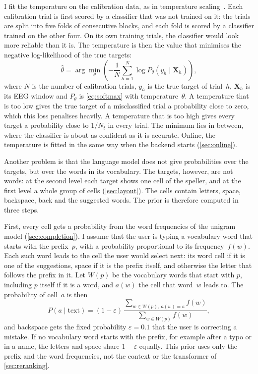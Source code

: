 I fit the temperature on the calibration data, as in temperature
scaling~\citep{guo2017calibration}. Each calibration trial is first scored by a
classifier that was not trained on it: the trials are split into five folds of
consecutive blocks, and each fold is scored by a classifier trained on the other four.
On its own training trials, the classifier would look more reliable than it is. The
temperature is then the value that minimises the negative log-likelihood of the true
targets:
\begin{equation}
    \hat{\theta} = \arg\min_{\theta} \left( -\frac{1}{N} \sum_{h=1}^{N} \log P_\theta(y_h \mid \mathbf{X}_h) \right),
    \label{eq:temperature}
\end{equation}
where $N$ is the number of calibration trials, $y_h$ is the true target of trial~$h$,
$\mathbf{X}_h$ is its \ac{EEG} window and $P_\theta$ is \cref{eq:softmax} with
temperature~$\theta$. A temperature that is too low gives the true target of a
misclassified trial a probability close to zero, which this loss penalises heavily. A
temperature that is too high gives every target a probability close to $1/N_t$ in
every trial. The minimum lies in between, where the classifier is about as confident
as it is accurate. Online, the temperature is fitted in the same way when the backend
starts (\cref{sec:online}).

Another problem is that the language model does not give probabilities over the targets,
but over the words in its vocabulary. The targets, however, are not words: at the
second level each target shows one cell of the speller, and at the first level a whole
group of cells (\cref{sec:layout}). The cells contain letters, space, backspace, back
and the suggested words. The prior is therefore computed in three steps.

First, every cell gets a probability from the word frequencies of the unigram model
(\cref{sec:completion}). I assume that the user is typing a vocabulary word that starts
with the prefix~$p$, with a probability proportional to its frequency~$f(w)$. Each such
word leads to the cell the user would select next: its word cell if it is one of the
suggestions, space if it is the prefix itself, and otherwise the letter that follows
the prefix in it. Let $W(p)$ be the vocabulary words that start with $p$, including $p$
itself if it is a word, and $a(w)$ the cell that word~$w$ leads to. The probability of
cell~$a$ is then
\begin{equation}
    P(a \mid \text{text}) = (1 - \varepsilon)\,
    \frac{\sum_{w \in W(p),\ a(w) = a} f(w)}{\sum_{w \in W(p)} f(w)},
    \label{eq:cell-probs}
\end{equation}
and backspace gets the fixed probability $\varepsilon = 0.1$ that the user is correcting
a mistake. If no vocabulary word starts with the prefix, for example after a typo or
in a name, the letters and space share $1 - \varepsilon$ equally. This prior uses only
the prefix and the word frequencies, not the context or the transformer of
\cref{sec:reranking}.

